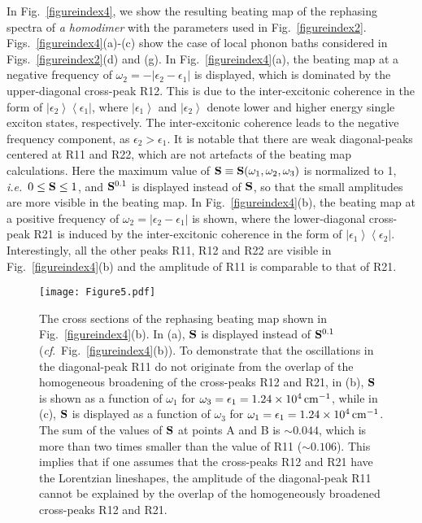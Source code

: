 \documentclass[%
 reprint,%
 amssymb, amsmath,%
 aip,cha,%
]{revtex4-1}
\newcommand{\bra}[1]{\ensuremath{\left\langle{#1}\right\vert}}
\newcommand{\ket}[1]{\ensuremath{\left|{#1}\right\rangle}}
\newcommand{\abs}[1]{\left|#1\right|}
\begin{document}
In Fig.~\ref{figureindex4}, we show the resulting beating map of the rephasing spectra of {\it a homodimer} with the parameters used in Fig.~\ref{figureindex2}. Figs.~\ref{figureindex4}(a)-(c) show the case of local phonon baths considered in Figs.~\ref{figureindex2}(d) and (g). In Fig.~\ref{figureindex4}(a), the beating map at a negative frequency of $\omega_2=-\abs{\epsilon_2-\epsilon_1}$ is displayed, which is dominated by the upper-diagonal cross-peak R12. This is due to the inter-excitonic coherence in the form of $\ket{\epsilon_2}\bra{\epsilon_1}$, where $\ket{\epsilon_1}$ and $\ket{\epsilon_2}$ denote lower and higher energy single exciton states, respectively. The inter-excitonic coherence leads to the negative frequency component, as $\epsilon_2>\epsilon_1$. It is notable that there are weak diagonal-peaks centered at R11 and R22, which are not artefacts of the beating map calculations. Here the maximum value of ${\bf S}\equiv{\bf S}(\omega_1,\omega_2,\omega_3)$ is normalized to 1, {\it i.e.}~$0\le{\bf S}\le 1$, and ${\bf S}^{0.1}$ is displayed instead of ${\bf S}$, so that the small amplitudes are more visible in the beating map. In Fig.~\ref{figureindex4}(b), the beating map at a positive frequency of $\omega_2=\abs{\epsilon_2-\epsilon_1}$ is shown, where the lower-diagonal cross-peak R21 is induced by the inter-excitonic coherence in the form of $\ket{\epsilon_1}\bra{\epsilon_2}$. Interestingly, all the other peaks R11, R12 and R22 are visible in Fig.~\ref{figureindex4}(b) and the amplitude of R11 is comparable to that of R21. 

\begin{figure}
	\texttt{[image: Figure5.pdf]}
	\caption{The cross sections of the rephasing beating map shown in Fig.~\ref{figureindex4}(b). In (a), ${\bf S}$ is displayed instead of ${\bf S}^{0.1}$ ({\it cf}.~Fig.~\ref{figureindex4}(b)). To demonstrate that the oscillations in the diagonal-peak R11 do not originate from the overlap of the homogeneous broadening of the cross-peaks R12 and R21, in (b), ${\bf S}$ is shown as a function of $\omega_1$ for $\omega_3=\epsilon_1=1.24\times 10^{4}\,{\rm cm}^{-1}$, while in (c), ${\bf S}$ is displayed as a function of $\omega_3$ for $\omega_1=\epsilon_1=1.24\times 10^{4}\,{\rm cm}^{-1}$. The sum of the values of ${\bf S}$ at points A and B is $\sim 0.044$, which is more than two times smaller than the value of R11 ($\sim 0.106$). This implies that if one assumes that the cross-peaks R12 and R21 have the Lorentzian lineshapes, the amplitude of the diagonal-peak R11 cannot be explained by the overlap of the homogeneously broadened cross-peaks R12 and R21.}
	\label{figureindex5} 
\end{figure}
\end{document}
